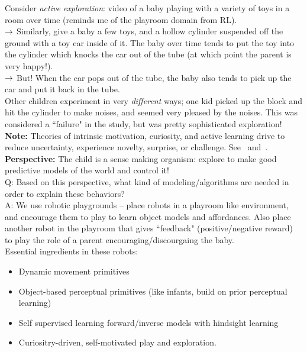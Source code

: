 Consider {\it active exploration}: video of a baby playing with a variety of toys in a room over time (reminds me of the playroom domain from RL). \\

$\rightarrow$ Similarly, give a baby a few toys, and a hollow cylinder suspended off the ground with a toy car inside of it. The baby over time tends to put the toy into the cylinder which knocks the car out of the tube (at which point the parent is very happy!). \\

$\rightarrow$ But! When the car pops out of the tube, the baby also tends to pick up the car and put it back in the tube. \\

Other children experiment in very {\it different} ways; one kid picked up the block and hit the cylinder to make noises, and seemed very pleased by the noises. This was considered a ``failure" in the study, but was pretty sophisticated exploration! \\

{\bf Note:} Theories of intrinsic motivation, curiosity, and active learning drive to reduce uncertainty, experience novelty, surprise, or challenge. See~\citet{berlyne1960conflict} and~\citet{berlyne1978curiosity}. \\

{\bf Perspective:} The child is a sense making organism: explore to make good predictive models of the world and control it! \\

Q: Based on this perspective, what kind of modeling/algorithms are needed in order to explain these behaviors? \\

A: We use robotic playgrounds -- place robots in a playroom like environment, and encourage them to play to learn object models and affordances. Also place another robot in the playroom that gives ``feedback" (positive/negative reward) to play the role of a parent encouraging/discourgaing the baby.\\

Essential ingredients in these robots:
\begin{itemize}
    \item Dynamic movement primitives
    \item Object-based perceptual primitives (like infants, build on prior perceptual learning)
    \item Self supervised learning forward/inverse models with hindsight learning
    \item Curiositry-driven, self-motivated play and exploration.
\end{itemize}


